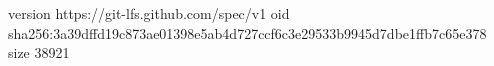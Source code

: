 version https://git-lfs.github.com/spec/v1
oid sha256:3a39dffd19c873ae01398e5ab4d727ccf6c3e29533b9945d7dbe1ffb7c65e378
size 38921

